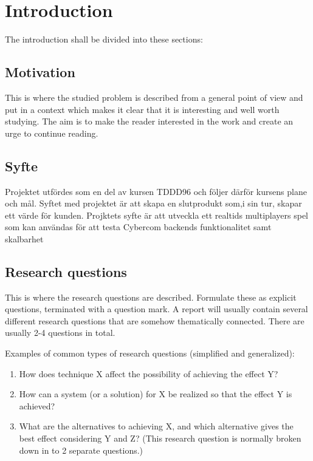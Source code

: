 \chapter{Introduction}
\label{cha:introduction}

The introduction shall be divided into these sections:

\section{Motivation}
\label{sec:motivation}

\cite{scigen}

This is where the studied problem is described from a general
point of view and put in a context which makes it clear that
it is interesting and well worth studying. The aim is to make
the reader interested in the work and create an urge to
continue reading.

\section{Syfte}
\label{sec:aim}


Projektet utfördes som en del av kursen TDDD96 och följer därför kursens plane och mål. Syftet med projektet är att skapa en slutprodukt som,i sin tur, skapar ett värde för kunden. 
Projktets syfte är att utveckla ett realtids multiplayers spel som kan användas för att testa Cybercom backends funktionalitet samt skalbarhet
\section{Research questions}
\label{sec:research-questions}


This is where the research questions are described.
Formulate these as explicit questions, terminated with a
question mark. A report will usually contain several different
research questions that are somehow thematically connected.
There are usually 2-4 questions in total.

Examples of common types of research questions (simplified
and generalized):

\begin{enumerate}
\item How does technique X affect the possibility of achieving the
  effect Y?

\item How can a system (or a solution) for X be realized so
  that the effect Y is achieved?

\item What are the alternatives to
  achieving X, and which alternative gives the best effect considering
  Y and Z? (This research question is normally broken down in to 2
  separate questions.)

\end{enumerate}


